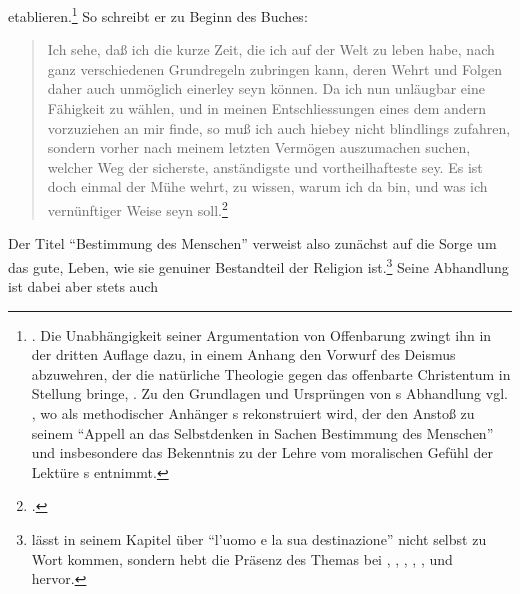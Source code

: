 etablieren.\footnote{\cite[Vgl.][3]{Spalding:BetrachtungueberdieBestimmungdesMenschen1749}.
Die Unabhängigkeit seiner Argumentation von Offenbarung zwingt ihn in der
dritten Auflage dazu, in einem Anhang den Vorwurf des Deismus abzuwehren, der
die natürliche Theologie gegen das offenbarte Christentum in Stellung bringe,
\cite[vgl.][26--32]{Spalding:BetrachtungueberdieBestimmungdesMenschen1749}.
Zu den Grundlagen und Ursprüngen von s Abhandlung vgl.
\cite{Schwaiger:ZurFragenachdenQuellenvonSpaldingsemphBestimmungdesMenschen1999},
wo  als
methodischer Anhänger s rekonstruiert wird, der den
Anstoß zu seinem \enquote{Appell an das Selbstdenken in Sachen Bestimmung des
Menschen}
\parencite[][13]{Schwaiger:ZurFragenachdenQuellenvonSpaldingsemphBestimmungdesMenschen1999}
und insbesondere das Bekenntnis zu der Lehre vom moralischen Gefühl
\parencite[vgl.][15]{Schwaiger:ZurFragenachdenQuellenvonSpaldingsemphBestimmungdesMenschen1999}
der Lektüre s entnimmt.} So schreibt er
zu Beginn des Buches:
\begin{quote}
  Ich sehe, daß ich die kurze Zeit, die ich auf der Welt zu leben habe, nach
  ganz verschiedenen Grundregeln zubringen kann, deren Wehrt und Folgen daher
  auch unmöglich einerley seyn können. Da ich nun unläugbar eine Fähigkeit zu
  wählen, und in meinen Entschliessungen eines dem andern vorzuziehen an mir
  finde, so muß ich auch hiebey nicht blindlings zufahren, sondern vorher nach
  meinem letzten Vermögen auszumachen suchen, welcher Weg der sicherste,
  anständigste und vortheilhafteste sey. \punkt{} Es ist doch einmal der Mühe
  wehrt, zu wissen, warum ich da bin, und was ich vernünftiger Weise seyn
  soll.\footcite[][4]{Spalding:BetrachtungueberdieBestimmungdesMenschen1749}
\end{quote}
Der Titel \enquote{Bestimmung des Menschen} verweist also zunächst auf die Sorge
um das gute,  Leben, wie sie genuiner Bestandteil der
Religion ist.\footnote{ \textcite[vgl.][47--103]{Ciafardone:LIlluminismotedesco1983}
lässt in seinem Kapitel über \enquote{l'uomo e la sua destinazione} nicht
 selbst zu
Wort kommen, sondern hebt die Präsenz des Themas bei , , ,
, 
,  und
 hervor.} Seine Abhandlung ist dabei aber stets auch
